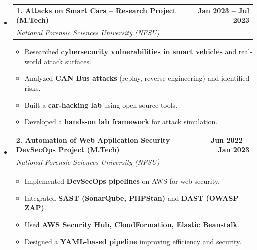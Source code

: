 \documentclass[letterpaper,10pt]{article}
\makeatletter
\newcommand{\resumeItem}[1]{\item\small{#1\vspace{-3pt}}}
\newcommand{\resumeSubheading}[4]{
  \vspace{-3pt}\item
    \begin{tabular*}{1.0\textwidth}[t]{l@{\extracolsep{\fill}}r}
      \textbf{#1} & \textbf{\small #2} \\
      \textit{\small#3} & \textit{\small #4} \\
    \end{tabular*}\vspace{-5pt}
}
\newcommand{\resumeItemListStart}{
  \begin{itemize}[leftmargin=0.15in,itemsep=0pt,topsep=0pt]
}
\newcommand{\resumeItemListEnd}{\end{itemize}\vspace{-5pt}}
\newcommand{\resumeSubHeadingListStart}{
  \begin{itemize}[leftmargin=0.0in, label={}]
}
\newcommand{\resumeSubHeadingListEnd}{\end{itemize}}
\makeatother
\begin{document}
\resumeSubHeadingListStart

\resumeSubheading
  {1. Attacks on Smart Cars -- Research Project (M.Tech)}
  {Jan 2023 -- Jul 2023}
  {National Forensic Sciences University (NFSU)}{}

\resumeItemListStart
  \resumeItem{Researched \textbf{cybersecurity vulnerabilities in smart vehicles} and real-world attack surfaces.}
  \resumeItem{Analyzed \textbf{CAN Bus attacks} (replay, reverse engineering) and identified risks.}
  \resumeItem{Built a \textbf{car-hacking lab} using open-source tools.}
  \resumeItem{Developed a \textbf{hands-on lab framework} for attack simulation.}
\resumeItemListEnd

\vspace{10pt}

\resumeSubheading
  {2. Automation of Web Application Security -- DevSecOps Project (M.Tech)}
  {Jun 2022 -- Jan 2023}
  {National Forensic Sciences University (NFSU)}{}

\resumeItemListStart
  \resumeItem{Implemented \textbf{DevSecOps pipelines} on AWS for web security.}
  \resumeItem{Integrated \textbf{SAST (SonarQube, PHPStan)} and \textbf{DAST (OWASP ZAP)}.}
  \resumeItem{Used \textbf{AWS Security Hub, CloudFormation, Elastic Beanstalk}.}
  \resumeItem{Designed a \textbf{YAML-based pipeline} improving efficiency and security.}
\resumeItemListEnd

\resumeSubHeadingListEnd
\end{document}
